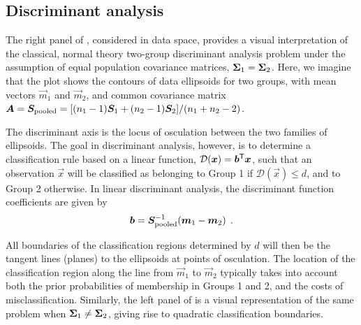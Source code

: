 \subsection{Discriminant analysis}\label{sec:discrim}

The right panel of , considered in data space, provides a
visual interpretation of the classical, normal theory two-group discriminant analysis problem
under the assumption of equal population covariance matrices, $\bm{\Sigma}_1 = \bm{\Sigma}_2$.
Here, we imagine that the plot shows the contours of data ellipsoids for two groups,
with mean vectors $\vec{m}_1$ and $\vec{m}_2$, and common covariance matrix
$\bm{A} = \bm{S}_{\textrm{pooled}} = [ (n_1 -1)\bm{S}_1 + (n_2 -1)\bm{S}_2 ] / (n_1 +n_2 -2) $.

The discriminant axis is the locus of osculation between the two families of ellipsoids.
The goal in discriminant analysis, however, is to determine a classification rule based on
a linear function, $\mathcal{D}(\bm{x}) = \bm{b}^\mathsf{T} \bm{x}$, such that
an observation $\vec{x}$ will be classified as belonging to Group 1 if
$\mathcal{D}(\vec{x}) \le d$, and to Group 2 otherwise.  In linear discriminant
analysis, the discriminant function coefficients are
given by
\begin{equation*}
\bm{b} = \bm{S}_{\textrm{pooled}}^{-1} ( \bm{m}_1 - \bm{m}_2 ) \:\: .
\end{equation*}

All boundaries
of the classification regions determined by $d$
will then be the tangent lines (planes) to the ellipsoids at points of osculation.
The location of the classification region along the line from $\vec{m}_1$ to $\vec{m}_2$
typically takes into account both the
prior probabilities of membership in Groups 1 and 2, and the costs of misclassification.
Similarly, the left panel of  is a visual representation of the
same problem when $\bm{\Sigma}_1 \ne \bm{\Sigma}_2$, giving rise to quadratic classification
boundaries.



